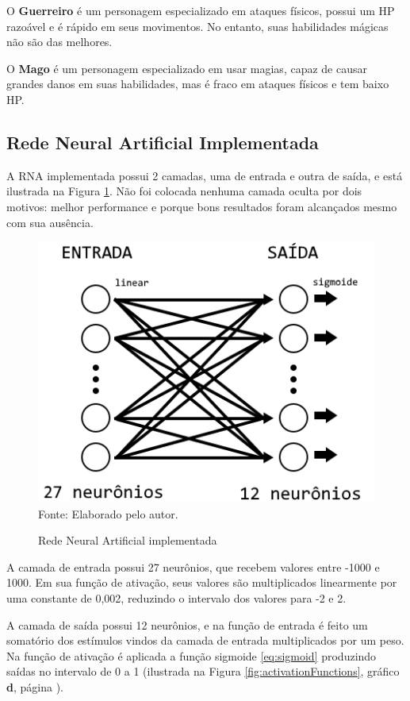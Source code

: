 \documentclass[12pt,a4paper]{article}
\newcommand{\source}[1]{\small Fonte: {#1}}
\begin{document}
	O \textbf{Guerreiro} é um personagem especializado em ataques físicos,
	possui um HP razoável e é rápido em seus movimentos.
	No entanto, suas habilidades mágicas não são das melhores.
	
	O \textbf{Mago} é um personagem especializado em usar magias,
	capaz de causar grandes danos em suas habilidades,
	mas é fraco em ataques físicos e tem baixo HP.
	
	\FloatBarrier
	\subsection{Rede Neural Artificial Implementada}
	A RNA implementada possui 2 camadas,
	uma de entrada e outra de saída,
	e está ilustrada na Figura \ref{fig:gameNN}.
	Não foi colocada nenhuma camada oculta por dois motivos:
	melhor performance e
	porque bons resultados foram alcançados mesmo com sua ausência.
	
	\begin{figure}[ht!]
		\centering
		\caption{Rede Neural Artificial implementada}
		\includegraphics[scale=0.9]{GameNN.png}\\
		\vspace{0.5mm}
		\source{Elaborado pelo autor.}
		\label{fig:gameNN}
	\end{figure}
	
	A camada de entrada possui 27 neurônios,
	que recebem valores entre -1000 e 1000.
	Em sua função de ativação,
	seus valores são multiplicados linearmente por uma constante de 0,002,
	reduzindo o intervalo dos valores para -2 e 2.
	
	A camada de saída possui 12 neurônios,
	e na função de entrada é feito um somatório dos estímulos vindos da camada de entrada multiplicados por um peso.
	Na função de ativação é aplicada a função sigmoide \eqref{eq:sigmoid}
	produzindo saídas no intervalo de 0 a 1
	(ilustrada na Figura \ref{fig:activationFunctions},
	gráfico \textbf{d},
	página \pageref{fig:activationFunctions}).
	
\end{document}
